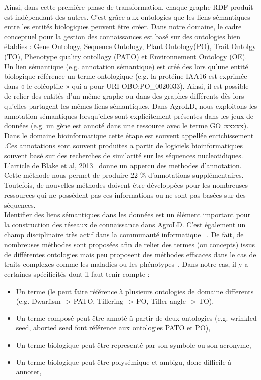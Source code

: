 Ainsi, dans cette première phase de transformation, chaque graphe RDF produit est indépendant des autres. C’est grâce aux ontologies que les liens sémantiques entre les entités biologiques peuvent être créer. Dans notre domaine, le cadre conceptuel pour la gestion des connaissances est basé sur des ontologies bien établies : Gene Ontology, Sequence Ontology, Plant Ontology(PO), Trait Ontolgy (TO), Phenotype quality ontollogy (PATO) et Environnement Ontology (OE). Un lien sémantique (e.g. annotation sémantique) est créé des lors qu’une entité biologique référence un terme ontologique (e.g. la protéine IAA16 est exprimée dans « le coléoptile » qui a pour URI OBO:PO\_0020033). Ainsi, il est possible de relier des entités d’un même graphe ou dans des graphes différents dès lors qu’elles partagent les mêmes liens sémantiques. Dans AgroLD, nous exploitons les annotation sémantiques lorsqu’elles sont explicitement présentes dans les jeux de données (e.g. un gène est annoté dans une ressource avec le terme GO :xxxxx). Dans le domaine bioinformatique cette étape est souvent appellée enrichissement \cite{Boyle2004,Sheehan2008,topgo2016}.Ces annotations sont souvent produites a partir de logiciels bioinformatiques souvent basé sur des recherches de similarité sur les séquences nucleotidiques. L'article de Blake et al, 2013~\cite{blake2013} donne un appercu des methodes d'annotation. Cette méthode nous permet de produire 22 \% d’annotations supplémentaires. Toutefois, de nouvelles méthodes doivent être développées pour les nombreuses ressources qui ne possèdent pas ces informations ou ne sont pas basées sur des séquences.\\

Identifier des liens sémantiques dans les données est un élément important pour la construction des réseaux de connaissance dans AgroLD. C’est également un champ disciplinaire très actif dans la communauté informatique~\cite{Faria2013,Otero-Cerdeira2015} . De fait, de nombreuses méthodes sont proposées afin de relier des termes (ou concepts) issus de différentes ontologies mais peu proposent des méthodes efficaces dans le cas de traits complexes comme les maladies ou les phénotypes~\cite{harrow2017}. Dans notre cas, il y a certaines spécificités dont il faut tenir compte : \\


\begin{itemize}
\item Un terme (le  peut faire référence à plusieurs ontologies de domaine differents (e.g. Dwarfism -> PATO, Tillering -> PO, Tiller angle -> TO),
\item Un terme composé peut être annoté à partir de deux ontologies (e.g. wrinkled seed, aborted seed font référence aux ontologies PATO et PO),
\item Un terme biologique peut être representé par son symbole ou son acronyme,
\item Un terme biologique peut être polysémique et ambigu, donc difficile à annoter,\\
\end{itemize}

